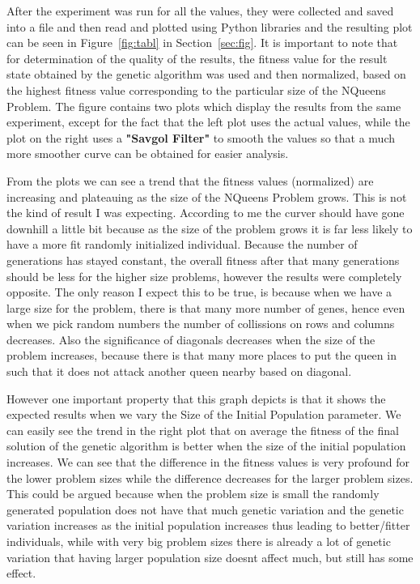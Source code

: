 \documentclass[11pt]{article}
\begin{document}
After the experiment was run for all the values, they were collected and saved into a file and then read and plotted using Python libraries and the resulting plot can be seen in Figure~\ref{fig:tabl} in Section~\ref{sec:fig}. It is important to note that for determination of the quality of the results, the fitness value for the result state obtained by the genetic algorithm was used and then normalized, based on the highest fitness value corresponding to the particular size of the NQueens Problem. The figure contains two plots which display the results from the same experiment, except for the fact that the left plot uses the actual values, while the plot on the right uses a \textbf{"Savgol Filter"} to smooth the values so that a much more smoother curve can be obtained for easier analysis.

From the plots we can see a trend that the fitness values (normalized) are increasing and plateauing as the size of the NQueens Problem grows. This is not the kind of result I was expecting. According to me the curver should have gone downhill a little bit because as the size of the problem grows it is far less likely to have a more fit randomly initialized individual. Because the number of generations has stayed constant, the overall fitness after that many generations should be less for the higher size problems, however the results were completely opposite. The only reason I expect this to be true, is because when we have a large size for the problem, there is that many more number of genes, hence even when we pick random numbers the number of collissions on rows and columns decreases. Also the significance of diagonals decreases when the size of the problem increases, because there is that many more places to put the queen in such that it does not attack another queen nearby based on diagonal.

However one important property that this graph depicts is that it shows the expected results when we vary the Size of the Initial Population parameter. We can easily see the trend in the right plot that on average the fitness of the final solution of the genetic algorithm is better when the size of the initial population increases. We can see that the difference in the fitness values is very profound for the lower problem sizes while the difference decreases for the larger problem sizes. This could be argued because when the problem size is small the randomly generated population does not have that much genetic variation and the genetic variation increases as the initial population increases thus leading to better/fitter individuals, while with very big problem sizes there is already a lot of genetic variation that having larger population size doesnt affect much, but still has some effect.
\end{document}
